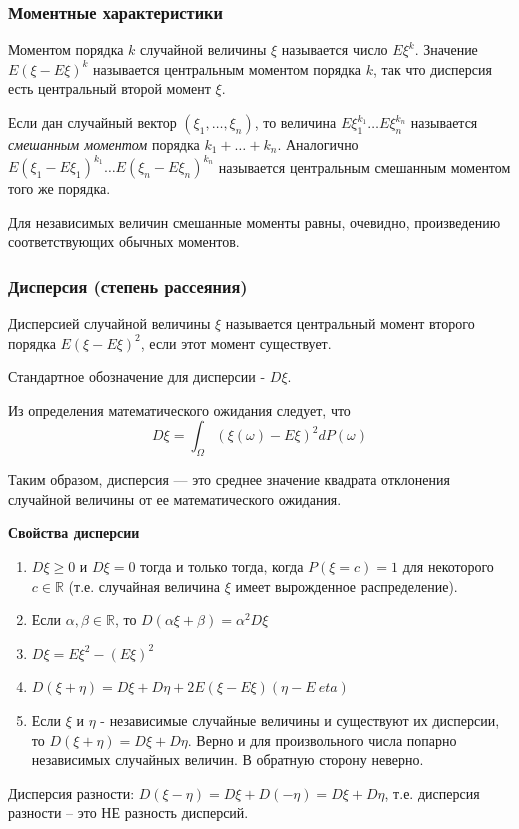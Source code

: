 \subsubsection{Моментные характеристики}

\begin{definition}[Момент]
	Моментом порядка $k$ случайной величины $\xi$ называется число $E\xi^k$. Значение $E(\xi - E\xi)^k$ называется центральным моментом порядка $k$, так что дисперсия есть центральный второй момент $\xi$.
	
	Если дан случайный вектор $(\xi_1, \dots, \xi_n)$, то величина $E\xi_1^{k_1} \dots E\xi_n^{k_n}$ называется \textit{смешанным моментом} порядка $k_1 + \dots + k_n$. Аналогично $E(\xi_1 - E\xi_1)^{k_1} \dots E(\xi_n - E\xi_n)^{k_n}$ называется центральным смешанным моментом того же порядка.
\end{definition}

Для независимых величин смешанные моменты равны, очевидно, произведению соответствующих обычных моментов.

\subsubsection{Дисперсия (степень рассеяния)}

\begin{definition}[Дисперсия]
	Дисперсией случайной величины $\xi$ называется центральный момент второго порядка $E(\xi - E\xi)^2$, если этот момент существует.
	
	Стандартное обозначение для дисперсии - $D\xi$.
	
	Из определения математического ожидания следует, что
	\[ D\xi = \int_{\Omega} ( \xi (\omega) - E\xi )^2 d P(\omega) \]
	
	Таким образом, дисперсия — это среднее значение квадрата отклонения случайной величины от ее математического ожидания.
\end{definition}

\begin{center}
	\textbf{Свойства дисперсии}
\end{center}
\begin{enumerate}
	\item $D\xi \ge 0$ и $D\xi = 0$ тогда и только тогда, когда $P(\xi = c) = 1$ для некоторого $c \in \mathbb{R}$ (т.е. случайная величина $\xi$ имеет вырожденное распределение).
	\item Если $\alpha, \beta \in \mathbb{R}$, то $D(\alpha \xi + \beta) = \alpha^2 D\xi$
	\item $D\xi = E\xi^2 - (E\xi)^2$
	\item $D(\xi + \eta) = D\xi + D\eta + 2E (\xi - E\xi) (\eta - E\ eta)$
	\item Если $\xi$ и $\eta$ - независимые случайные величины и существуют их дисперсии, то $D(\xi + \eta) = D\xi + D \eta$. Верно и для произвольного числа попарно независимых случайных величин. В обратную сторону неверно.
\end{enumerate}
\begin{remark}
	Дисперсия разности: $D(\xi - \eta) = D\xi + D(-\eta) = D\xi + D\eta$, т.е. дисперсия разности – это НЕ разность дисперсий.
\end{remark}

